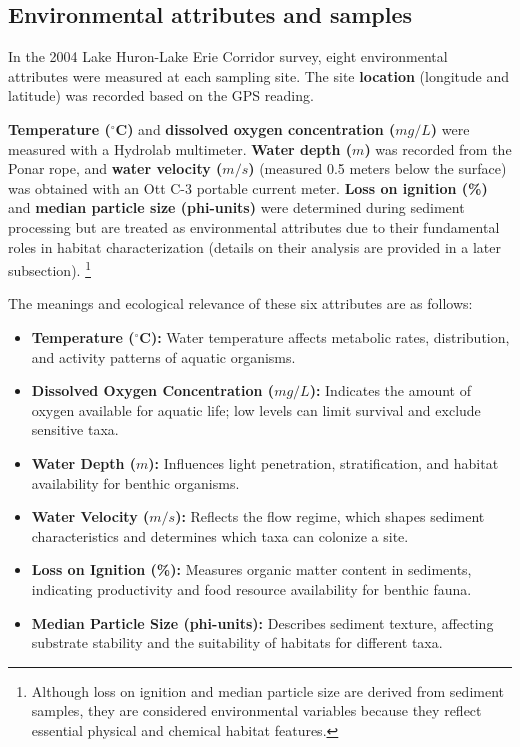 \subsection{Environmental attributes and samples}

In the 2004 Lake Huron-Lake Erie Corridor survey, eight environmental attributes were measured at each sampling site. The site \textbf{location} (longitude and latitude) was recorded based on the GPS reading.

\textbf{Temperature ($^\circ$C)} and \textbf{dissolved oxygen concentration ($mg/L$)} were measured with a Hydrolab multimeter. 
\textbf{Water depth ($m$)} was recorded from the Ponar rope, and \textbf{water velocity ($m/s$)} 
(measured 0.5 meters below the surface) was obtained with an Ott C-3 portable current meter. 
\textbf{Loss on ignition (\%)} and \textbf{median particle size (phi-units)} were determined during sediment 
processing but are treated as environmental attributes due to their fundamental roles in habitat
 characterization (details on their analysis are provided in a later subsection).
\footnote{Although loss on ignition and median particle size are derived from sediment samples, 
they are considered environmental variables because they reflect essential physical and chemical habitat features.}

\vspace{0.2em}
The meanings and ecological relevance of these six attributes are as follows:

\begin{itemize}
    \item \textbf{Temperature ($^\circ$C):} Water temperature affects metabolic rates, distribution, and activity patterns of aquatic organisms.
    \item \textbf{Dissolved Oxygen Concentration ($mg/L$):} Indicates the amount of oxygen available for aquatic life; low levels can limit survival and exclude sensitive taxa.
    \item \textbf{Water Depth ($m$):} Influences light penetration, stratification, and habitat availability for benthic organisms.
    \item \textbf{Water Velocity ($m/s$):} Reflects the flow regime, which shapes sediment characteristics and determines which taxa can colonize a site.
    \item \textbf{Loss on Ignition (\%):} Measures organic matter content in sediments, indicating productivity and food resource availability for benthic fauna.
    \item \textbf{Median Particle Size (phi-units):} Describes sediment texture, affecting substrate stability and the suitability of habitats for different taxa.
\end{itemize}

